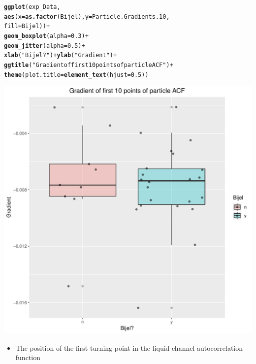 \documentclass{article}\usepackage[]{graphicx}\usepackage[]{color}
\makeatletter
\def\maxwidth{ %
  \ifdim\Gin@nat@width>\linewidth
    \linewidth
  \else
    \Gin@nat@width
  \fi
}
\newcommand{\hlnum}[1]{\textcolor[rgb]{0.686,0.059,0.569}{#1}}%
\newcommand{\hlstr}[1]{\textcolor[rgb]{0.192,0.494,0.8}{#1}}%
\newcommand{\hlopt}[1]{\textcolor[rgb]{0,0,0}{#1}}%
\newcommand{\hlstd}[1]{\textcolor[rgb]{0.345,0.345,0.345}{#1}}%
\newcommand{\hlkwc}[1]{\textcolor[rgb]{0.333,0.667,0.333}{#1}}%
\newcommand{\hlkwd}[1]{\textcolor[rgb]{0.737,0.353,0.396}{\textbf{#1}}}%
\newenvironment{kframe}{%
 \def\at@end@of@kframe{}%
 \ifinner\ifhmode%
  \def\at@end@of@kframe{\end{minipage}}%
  \begin{minipage}{\columnwidth}%
 \fi\fi%
 \def\FrameCommand##1{\hskip\@totalleftmargin \hskip-\fboxsep
 \colorbox{shadecolor}{##1}\hskip-\fboxsep
     \hskip-\linewidth \hskip-\@totalleftmargin \hskip\columnwidth}%
 \MakeFramed {\advance\hsize-\width
   \@totalleftmargin\z@ \linewidth\hsize
   \@setminipage}}%
 {\par\unskip\endMakeFramed%
 \at@end@of@kframe}
\newenvironment{knitrout}{}{} %
\makeatother
\begin{document}
\begin{knitrout}
\begin{kframe}
\begin{alltt}
\hlkwd{ggplot}\hlstd{(exp_Data,}
       \hlkwd{aes}\hlstd{(}\hlkwc{x}\hlstd{=}\hlkwd{as.factor}\hlstd{(Bijel),} \hlkwc{y}\hlstd{=Particle.Gradients.10,}
           \hlkwc{fill}\hlstd{=Bijel))} \hlopt{+}
       \hlkwd{geom_boxplot}\hlstd{(}\hlkwc{alpha}\hlstd{=}\hlnum{0.3}\hlstd{)} \hlopt{+}
       \hlkwd{geom_jitter}\hlstd{(}\hlkwc{alpha}\hlstd{=}\hlnum{0.5}\hlstd{)} \hlopt{+}
       \hlkwd{xlab}\hlstd{(}\hlstr{"Bijel?"}\hlstd{)} \hlopt{+} \hlkwd{ylab}\hlstd{(}\hlstr{"Gradient"}\hlstd{)} \hlopt{+}
       \hlkwd{ggtitle}\hlstd{(}\hlstr{"Gradient of first 10 points of particle ACF"}\hlstd{)} \hlopt{+}
       \hlkwd{theme}\hlstd{(}\hlkwc{plot.title} \hlstd{=} \hlkwd{element_text}\hlstd{(}\hlkwc{hjust} \hlstd{=} \hlnum{0.5}\hlstd{))}
\end{alltt}
\end{kframe}
\includegraphics[width=\maxwidth]{figure/unnamed-chunk-2-2} 

\end{knitrout}

\begin{itemize}
\item The position of the first turning point in the liquid channel autocorrelation function
\end{itemize}
\end{document}
